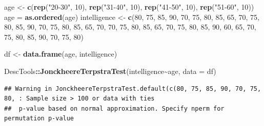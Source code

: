 \documentclass[
]{ctexart}
\newenvironment{Shaded}{\begin{snugshade}}{\end{snugshade}}
\newcommand{\AttributeTok}[1]{\textcolor[rgb]{0.13,0.29,0.53}{#1}}
\newcommand{\DecValTok}[1]{\textcolor[rgb]{0.00,0.00,0.81}{#1}}
\newcommand{\FunctionTok}[1]{\textcolor[rgb]{0.13,0.29,0.53}{\textbf{#1}}}
\newcommand{\NormalTok}[1]{#1}
\newcommand{\OtherTok}[1]{\textcolor[rgb]{0.56,0.35,0.01}{#1}}
\newcommand{\SpecialCharTok}[1]{\textcolor[rgb]{0.81,0.36,0.00}{\textbf{#1}}}
\newcommand{\StringTok}[1]{\textcolor[rgb]{0.31,0.60,0.02}{#1}}
\begin{document}
\begin{Shaded}
\begin{Highlighting}[]
\NormalTok{age }\OtherTok{\textless{}{-}} \FunctionTok{c}\NormalTok{(}\FunctionTok{rep}\NormalTok{(}\StringTok{"20{-}30"}\NormalTok{, }\DecValTok{10}\NormalTok{), }\FunctionTok{rep}\NormalTok{(}\StringTok{"31{-}40"}\NormalTok{, }\DecValTok{10}\NormalTok{), }
         \FunctionTok{rep}\NormalTok{(}\StringTok{"41{-}50"}\NormalTok{, }\DecValTok{10}\NormalTok{), }\FunctionTok{rep}\NormalTok{(}\StringTok{"51{-}60"}\NormalTok{, }\DecValTok{10}\NormalTok{))}
\NormalTok{age }\OtherTok{=} \FunctionTok{as.ordered}\NormalTok{(age)}
\NormalTok{intelligence }\OtherTok{\textless{}{-}} \FunctionTok{c}\NormalTok{(}\DecValTok{80}\NormalTok{, }\DecValTok{75}\NormalTok{, }\DecValTok{85}\NormalTok{, }\DecValTok{90}\NormalTok{, }\DecValTok{70}\NormalTok{, }\DecValTok{75}\NormalTok{, }\DecValTok{80}\NormalTok{, }\DecValTok{85}\NormalTok{, }\DecValTok{65}\NormalTok{, }\DecValTok{70}\NormalTok{,}
                   \DecValTok{75}\NormalTok{, }\DecValTok{80}\NormalTok{, }\DecValTok{85}\NormalTok{, }\DecValTok{90}\NormalTok{, }\DecValTok{70}\NormalTok{, }\DecValTok{75}\NormalTok{, }\DecValTok{80}\NormalTok{, }\DecValTok{85}\NormalTok{, }\DecValTok{65}\NormalTok{, }\DecValTok{70}\NormalTok{,}
                   \DecValTok{70}\NormalTok{, }\DecValTok{75}\NormalTok{, }\DecValTok{80}\NormalTok{, }\DecValTok{85}\NormalTok{, }\DecValTok{65}\NormalTok{, }\DecValTok{70}\NormalTok{, }\DecValTok{75}\NormalTok{, }\DecValTok{80}\NormalTok{, }\DecValTok{85}\NormalTok{, }\DecValTok{90}\NormalTok{,}
                   \DecValTok{60}\NormalTok{, }\DecValTok{65}\NormalTok{, }\DecValTok{70}\NormalTok{, }\DecValTok{75}\NormalTok{, }\DecValTok{80}\NormalTok{, }\DecValTok{85}\NormalTok{, }\DecValTok{90}\NormalTok{, }\DecValTok{70}\NormalTok{, }\DecValTok{75}\NormalTok{, }\DecValTok{80}\NormalTok{)}

\NormalTok{df }\OtherTok{\textless{}{-}} \FunctionTok{data.frame}\NormalTok{(age, intelligence)}

\NormalTok{DescTools}\SpecialCharTok{::}\FunctionTok{JonckheereTerpstraTest}\NormalTok{(intelligence}\SpecialCharTok{\textasciitilde{}}\NormalTok{age,}
                                  \AttributeTok{data =}\NormalTok{ df)}
\end{Highlighting}
\end{Shaded}

\begin{verbatim}
## Warning in JonckheereTerpstraTest.default(c(80, 75, 85, 90, 70, 75, 80, : Sample size > 100 or data with ties 
##  p-value based on normal approximation. Specify nperm for permutation p-value
\end{verbatim}
\end{document}
